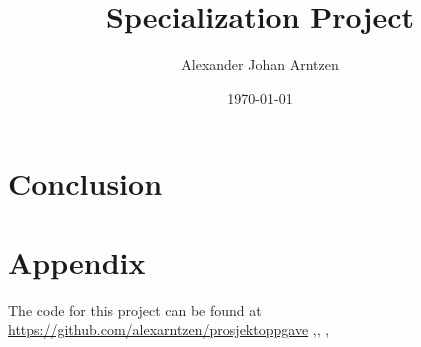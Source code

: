 \documentclass{article}
\title{Specialization Project}
\author{Alexander Johan Arntzen }
\date{\today}
\begin{document}
\maketitle
\tableofcontents







\FloatBarrier

\section{Conclusion}



\section*{Appendix}
The code for this project can be found at \url{https://github.com/alexarntzen/prosjektoppgave}
\cite{wien2019ASM},\cite{celledoni2016}, \cite{mocap} \cite{bauer2015why}, \cite{jørgen2021}
\cite{bauer2014overview}
\printbibliography
\end{document}
